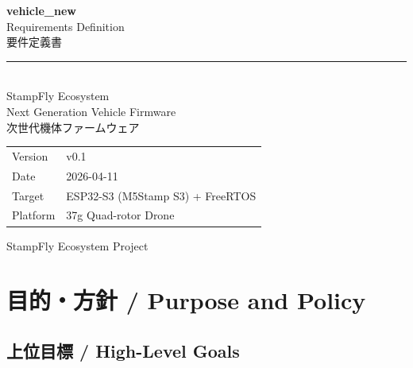 \documentclass[a4paper,11pt]{article}
\begin{document}
\begin{titlepage}
\begin{center}
\vspace*{40mm}

{\Huge\bfseries\color{accentdark} vehicle\_new}\\[8mm]
{\LARGE Requirements Definition}\\[2mm]
{\LARGE 要件定義書}\\[20mm]

\textcolor{bordercolor}{\rule{0.6\textwidth}{0.4pt}}\\[10mm]

{\large StampFly Ecosystem}\\[2mm]
{\large Next Generation Vehicle Firmware}\\[2mm]
{\large 次世代機体ファームウェア}\\[20mm]

\begin{tabular}{ll}
\color{subtlegray}Version & v0.1 \\
\color{subtlegray}Date & 2026-04-11 \\
\color{subtlegray}Target & ESP32-S3 (M5Stamp S3) + FreeRTOS \\
\color{subtlegray}Platform & 37g Quad-rotor Drone \\
\end{tabular}

\vfill
{\small\color{subtlegray} StampFly Ecosystem Project}
\end{center}
\end{titlepage}

\tableofcontents
\newpage

\section{目的・方針 / Purpose and Policy}

\subsection{上位目標 / High-Level Goals}
\end{document}
